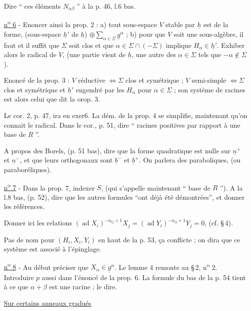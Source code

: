 Dire `` ces éléments $N_{\alpha\beta}$ '' à la p. 46, l.6 bas.

\uline{n\textsuperscript{o} 6} - Enoncer ainsi la prop. 2 : a) tout sous-espace $V$ stable par $\underline{h}$ est de la forme, (sous-espace $\underline{h}'$ de $\underline{h}$) $\oplus\sum_{\alpha\in\Sigma}\underline{g}^{\alpha}$ ; b) pour que $V$ soit une sous-algèbre, il faut et il suffit que $\Sigma$ soit clos et que $\alpha\in\Sigma\cap(-\Sigma)$ implique $H_\alpha\in\underline{h}'$. Exhiber alors le radical de $V$, (une partie vient de $\underline{h}$, une autre des $\alpha\in\Sigma$ tels que $-\alpha\notin\Sigma$).

Enoncé de la prop. 3 : $V$ réductive $\Longleftrightarrow\Sigma$ clos et symétrique ; $V$ semi-simple $\Longleftrightarrow\Sigma$ clos et symétrique et $\underline{h}'$ engendré par les $H_\alpha$ pour $\alpha\in\Sigma$ ; son système de racines est alors celui que dit la orop. 3.

Le cor. 2, p. 47, ira en exer6. La dém. de la prop. 4 se simplifie, maintenant qu'on connait le radical. Dans le cor., p. 51, dire `` racines positives par rapport à une base de $R$ ''.

A propos des Borels, (p. 51 bas), dire que la forme quadratique est nulle sur $\underline{n}^{+}$ et $\underline{n}^{-}$, et que leurs orthogonaux sont $\underline{b}^{-}$ et $\underline{b}^{+}$. On parlera des paraboliques, (ou paraboréliques).

\uline{n\textsuperscript{o} 7} - Dans la prop. 7, indexer $S$, (qui s'appelle maintenant `` base de $R$ ''). A la l.8 bas, (p. 52), dire que les autres formules ``ont déjà été démontrées'', et donner les références.

Donner ici les relations $(\operatorname{ad}X_i)^{-a_{ij}+1}X_j=(\operatorname{ad}Y_i)^{-a_{ij}+1}Y_j=0$, (cf. \S\,4).

Pas de nom pour $(H_i,X_i,Y_i)$ en haut de la p. 53, ça conflicte ; on dira que ce système est associé à l'épinglage.

\uline{n\textsuperscript{o} 8} - Au début préciser que $X_\alpha\in\underline{g}^{\alpha}$. Le lemme 4 remonte au \S\,2, n\textsuperscript{o} 2. Introduire $p$ aussi dans l'énoncé de la prop. 6. La formule du bas de la p. 54 tient à ce que $\alpha+\beta$ est une racine ; le dire.


\uline{Sur certains anneaux gradués}


